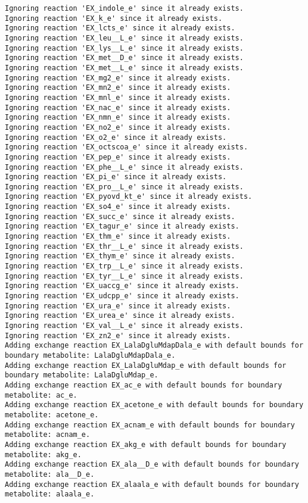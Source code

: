 \documentclass[
  letterpaper,
  DIV=11,
  numbers=noendperiod]{scrartcl}
\begin{document}
\begin{verbatim}
Ignoring reaction 'EX_indole_e' since it already exists.
Ignoring reaction 'EX_k_e' since it already exists.
Ignoring reaction 'EX_lcts_e' since it already exists.
Ignoring reaction 'EX_leu__L_e' since it already exists.
Ignoring reaction 'EX_lys__L_e' since it already exists.
Ignoring reaction 'EX_met__D_e' since it already exists.
Ignoring reaction 'EX_met__L_e' since it already exists.
Ignoring reaction 'EX_mg2_e' since it already exists.
Ignoring reaction 'EX_mn2_e' since it already exists.
Ignoring reaction 'EX_mnl_e' since it already exists.
Ignoring reaction 'EX_nac_e' since it already exists.
Ignoring reaction 'EX_nmn_e' since it already exists.
Ignoring reaction 'EX_no2_e' since it already exists.
Ignoring reaction 'EX_o2_e' since it already exists.
Ignoring reaction 'EX_octscoa_e' since it already exists.
Ignoring reaction 'EX_pep_e' since it already exists.
Ignoring reaction 'EX_phe__L_e' since it already exists.
Ignoring reaction 'EX_pi_e' since it already exists.
Ignoring reaction 'EX_pro__L_e' since it already exists.
Ignoring reaction 'EX_pyovd_kt_e' since it already exists.
Ignoring reaction 'EX_so4_e' since it already exists.
Ignoring reaction 'EX_succ_e' since it already exists.
Ignoring reaction 'EX_tagur_e' since it already exists.
Ignoring reaction 'EX_thm_e' since it already exists.
Ignoring reaction 'EX_thr__L_e' since it already exists.
Ignoring reaction 'EX_thym_e' since it already exists.
Ignoring reaction 'EX_trp__L_e' since it already exists.
Ignoring reaction 'EX_tyr__L_e' since it already exists.
Ignoring reaction 'EX_uaccg_e' since it already exists.
Ignoring reaction 'EX_udcpp_e' since it already exists.
Ignoring reaction 'EX_ura_e' since it already exists.
Ignoring reaction 'EX_urea_e' since it already exists.
Ignoring reaction 'EX_val__L_e' since it already exists.
Ignoring reaction 'EX_zn2_e' since it already exists.
Adding exchange reaction EX_LalaDgluMdapDala_e with default bounds for boundary metabolite: LalaDgluMdapDala_e.
Adding exchange reaction EX_LalaDgluMdap_e with default bounds for boundary metabolite: LalaDgluMdap_e.
Adding exchange reaction EX_ac_e with default bounds for boundary metabolite: ac_e.
Adding exchange reaction EX_acetone_e with default bounds for boundary metabolite: acetone_e.
Adding exchange reaction EX_acnam_e with default bounds for boundary metabolite: acnam_e.
Adding exchange reaction EX_akg_e with default bounds for boundary metabolite: akg_e.
Adding exchange reaction EX_ala__D_e with default bounds for boundary metabolite: ala__D_e.
Adding exchange reaction EX_alaala_e with default bounds for boundary metabolite: alaala_e.

\end{verbatim}
\end{document}

